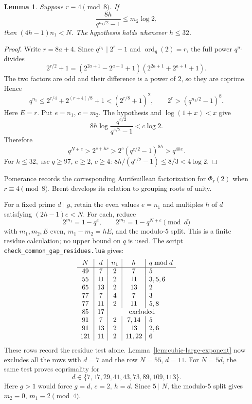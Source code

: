 \documentclass[11pt]{article}
\newtheorem{lemma}{Lemma}
\begin{document}
\begin{lemma}\label{lem:aurifeuillean-height}
Suppose $r\equiv4\pmod8$. If
\[
\frac{8h}{q^{n_1/2}-1}\le m_2\log2,
\]
then $(4h-1)n_1<N$. The hypothesis holds whenever $h\le32$.

\end{lemma}
\begin{proof}
Write $r=8a+4$. Since $q^{n_1}\mid2^r-1$ and
$\operatorname{ord}_q(2)=r$, the full power $q^{n_1}$ divides
\[
2^{r/2}+1
=(2^{2a+1}-2^{a+1}+1)(2^{2a+1}+2^{a+1}+1).
\]
The two factors are odd and their difference is a power of $2$,
so they are coprime. Hence
\[
q^{n_1}\le2^{r/4}+2^{(r+4)/8}+1
 <(2^{r/8}+1)^2,
\qquad 2^r>(q^{n_1/2}-1)^8.
\]
Here $E=r$. Put $e=n_1$, $c=m_2$. The hypothesis and
$\log(1+x)<x$ give
\[
8h\log\frac{q^{e/2}}{q^{e/2}-1}<c\log2.
\]
Therefore
\[
q^{N+e}>2^{c+hr}
 >2^c(q^{e/2}-1)^{8h}>q^{4he}.
\]
For $h\le32$, use $q\ge97$, $e\ge2$, $c\ge4$:
$8h/(q^{e/2}-1)\le8/3<4\log2$.

\end{proof}
Pomerance \cite[\S2, (1)]{PomCycl} records the corresponding
Aurifeuillean factorization for $\Phi_r(2)$ when $r\equiv4\pmod8$.
Brent \cite[\S\S2--3]{Brent} develops its relation to grouping
roots of unity.

For a fixed prime $d\mid g$, retain the even values $e=n_1$ and
multiples $h$ of $d$ satisfying $(2h-1)e<N$.
For each, reduce
\[
2^{m_1}=1-q^e,\qquad 2^{m_2}=1-q^{N+e}\pmod d
\]
with $m_1,m_2,E$ even, $m_1-m_2=hE$, and the modulo-$5$ split.
This is a finite residue calculation; no upper bound on $q$ is used.
The script \texttt{check\_common\_gap\_residues.lua} gives:
\[
\begin{array}{c|c|c|c|l}
N&d&n_1&h&q\bmod d\\\hline
49&7&2&7&5\\
55&11&2&11&3,5,6\\
65&13&2&13&2\\
77&7&4&7&3\\
77&11&2&11&5,8\\
85&17&\multicolumn{3}{c}{\text{excluded}}\\
91&7&2&7,14&5\\
91&13&2&13&2,6\\
121&11&2&11,22&6
\end{array}
\]
These rows record the residue test alone. Lemma~\ref{lem:cubic-large-exponent}
now excludes all the rows with $d=7$ and the row $N=55$, $d=11$.
For $N=5d$, the same test proves coprimality for
\[
d\in\{7,17,29,41,43,73,89,109,113\}.
\]
Here $g>1$ would force $g=d$, $e=2$, $h=d$.
Since $5\mid N$, the modulo-$5$ split gives
$m_2\equiv0$, $m_1\equiv2\pmod4$.
\end{document}
